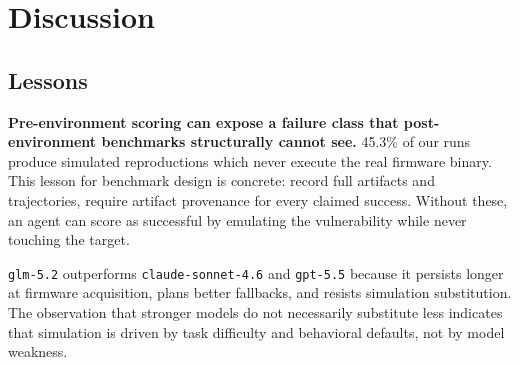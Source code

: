 \section{Discussion}
\label{sec:discussion}

\subsection{Lessons}
\label{sec:lessons}


\textbf{Pre-environment scoring can expose a failure class that post-environment benchmarks structurally cannot see.} 45.3\% of our runs produce simulated reproductions which never execute the real firmware binary. This lesson for benchmark design is concrete: record full artifacts and trajectories, require artifact provenance for every claimed success. Without these, an agent can score as successful by emulating the vulnerability while never touching the target.

 \texttt{glm-5.2} outperforms \texttt{claude-sonnet-4.6} and \texttt{gpt-5.5} because it persists longer at firmware acquisition, plans better fallbacks, and resists simulation substitution. The observation that stronger models do not necessarily substitute less indicates that simulation is driven by task difficulty and behavioral defaults, not by model weakness.



